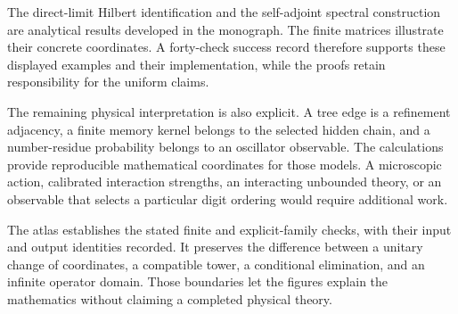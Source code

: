 The direct-limit Hilbert identification and the self-adjoint spectral construction are analytical results developed in the monograph. The finite matrices illustrate their concrete coordinates. A forty-check success record therefore supports these displayed examples and their implementation, while the proofs retain responsibility for the uniform claims.

The remaining physical interpretation is also explicit. A tree edge is a refinement adjacency, a finite memory kernel belongs to the selected hidden chain, and a number-residue probability belongs to an oscillator observable. The calculations provide reproducible mathematical coordinates for those models. A microscopic action, calibrated interaction strengths, an interacting unbounded theory, or an observable that selects a particular digit ordering would require additional work.

\begin{sectionrecap}
The atlas establishes the stated finite and explicit-family checks, with their input and output identities recorded. It preserves the difference between a unitary change of coordinates, a compatible tower, a conditional elimination, and an infinite operator domain. Those boundaries let the figures explain the mathematics without claiming a completed physical theory.
\end{sectionrecap}
\endgroup
